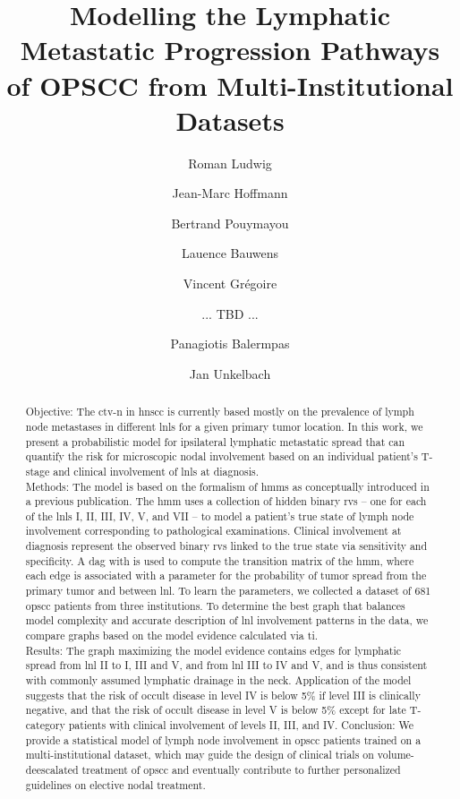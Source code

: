 \documentclass[twocolumn]{aastex631}
\begin{document}
\title{Modelling the Lymphatic Metastatic Progression Pathways of OPSCC from Multi-Institutional Datasets}


\author{Roman Ludwig}
\author{Jean-Marc Hoffmann}
\author{Bertrand Pouymayou}
\author{Lauence Bauwens}
\author{Vincent Grégoire}
\author{... TBD ...}
\author{Panagiotis Balermpas}
\author{Jan Unkelbach}

\begin{abstract}
    Objective: The \gls{ctv-n} in \gls{hnscc} is currently based mostly on the prevalence of lymph node metastases in different \glspl{lnl} for a given primary tumor location. In this work, we present a probabilistic model for ipsilateral lymphatic metastatic spread that can quantify the risk for microscopic nodal involvement based on an individual patient's T-stage and clinical involvement of \glspl{lnl} at diagnosis. \\
    Methods: The model is based on the formalism of \glspl{hmm} as conceptually introduced in a previous publication. The \gls{hmm} uses a collection of hidden binary \glspl{rv} -- one for each of the \glspl{lnl} I, II, III, IV, V, and VII -- to model a patient's true state of lymph node involvement corresponding to pathological examinations. Clinical involvement at diagnosis represent the observed binary \glspl{rv} linked to the true state via sensitivity and specificity. A \gls{dag} with is used to compute the transition matrix of the \gls{hmm}, where each edge is associated with a parameter for the probability of tumor spread from the primary tumor and between \gls{lnl}. To learn the parameters, we collected a dataset of 681 \gls{opscc} patients from three institutions. To determine the best graph that balances model complexity and accurate description of \gls{lnl} involvement patterns in the data, we compare graphs based on the model evidence calculated via \gls{ti}. \\
    Results: The graph maximizing the model evidence contains edges for lymphatic spread from \gls{lnl} II to I, III and V, and from \gls{lnl} III to IV and V, and is thus consistent with commonly assumed lymphatic drainage in the neck. Application of the model suggests that the risk of occult disease in level IV is below 5\% if level III is clinically negative, and that the risk of occult disease in level V is below 5\% except for late T-category patients with clinical involvement of levels II, III, and IV. 
    Conclusion: We provide a statistical model of lymph node involvement in \gls{opscc} patients trained on a multi-institutional dataset, which may guide the design of clinical trials on volume-deescalated treatment of \gls{opscc} and eventually contribute to further personalized guidelines on elective nodal treatment.
\end{abstract}
\end{document}
